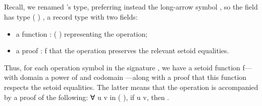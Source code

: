\begin{code}%
\>[0]\<%
\\
\>[0]\AgdaSpace{}%
\AgdaSpace{}%
\AgdaSpace{}%
\AgdaSpace{}%
\AgdaSymbol{:}\AgdaSpace{}%
\AgdaSpace{}%
\AgdaSymbol{(}\AgdaSpace{}%
\AgdaSpace{}%
\AgdaSpace{}%
\AgdaSpace{}%
\AgdaSpace{}%
\AgdaSymbol{(}\AgdaSpace{}%
\AgdaSpace{}%
\AgdaSymbol{))}\AgdaSpace{}%
\<%
\\
\>[0][@{}l@{\AgdaIndent{0}}]%
\>[1]%
\>[8]%
\>[16]\AgdaSymbol{:}\AgdaSpace{}%
\AgdaSpace{}%
\AgdaSpace{}%
\<%
\\
%
\>[8]%
\>[16]\AgdaSymbol{:}\AgdaSpace{}%
\AgdaSpace{}%
\AgdaSpace{}%
\AgdaSpace{}%
\AgdaSpace{}%
\AgdaSpace{}%
\<%
\\
\>[0]\<%
\end{code}
Recall, we renamed \agda's  type, preferring instead the long-arrow symbol
, so the  field has type  (  
) , a record type with two fields:
\begin{itemize}
\item a function   \as :  (   )
     representing the operation;
\item a proof  \as : \ab f  that the
operation preserves the relevant setoid equalities.
\end{itemize}
Thus, for each operation symbol in the signature , we have a setoid function
\ab f---with domain a power of  and codomain ---along with
a proof that this function respects the setoid equalities.  The latter means that the
operation  is accompanied by a proof of the following: ∀ \ab u \ab v in
 (   ), if \ab u  \ab v, then 
     .

